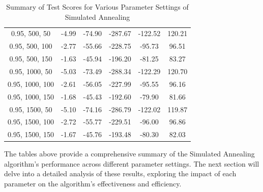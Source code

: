 \documentclass{article}
\begin{document}
\begin{table}[H]
{\begin{tabular}{|c|c|c|c|c|c|}
                0.95, 500, 50              & -4.99                      & -74.90                     & -287.67                    & -122.52                  & 120.21                  \\
                0.95, 500, 100             & -2.77                      & -55.66                     & -228.75                    & -95.73                   & 96.51                   \\
                0.95, 500, 150             & -1.63                      & -45.94                     & -196.20                    & -81.25                   & 83.27                   \\
                0.95, 1000, 50             & -5.03                      & -73.49                     & -288.34                    & -122.29                  & 120.70                  \\
                0.95, 1000, 100            & -2.61                      & -56.05                     & -227.99                    & -95.55                   & 96.16                   \\
                0.95, 1000, 150            & -1.68                      & -45.43                     & -192.60                    & -79.90                   & 81.66                   \\
                0.95, 1500, 50             & -5.10                      & -74.16                     & -286.79                    & -122.02                  & 119.87                  \\
                0.95, 1500, 100            & -2.72                      & -55.77                     & -229.51                    & -96.00                   & 96.86                   \\
                0.95, 1500, 150            & -1.67                      & -45.76                     & -193.48                    & -80.30                   & 82.03                   \\
                \hline
            \end{tabular}
        }
        \caption{Summary of Test Scores for Various Parameter Settings of Simulated Annealing}
        \label{tab:sa_summary_test_scores}
    \end{table}

    The tables above provide a comprehensive summary of the Simulated Annealing algorithm's performance across different parameter settings. The next section will delve into a detailed analysis of these results, exploring the impact of each parameter on the algorithm's effectiveness and efficiency.
\end{document}
